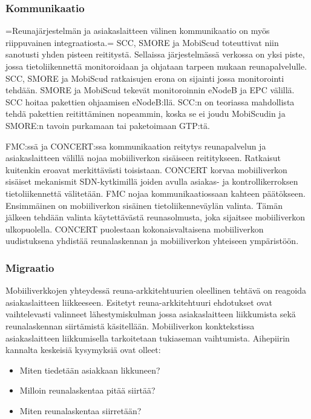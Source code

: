 \subsubsection{Kommunikaatio}
=Reunajärjestelmän ja asiakaslaitteen välinen kommunikaatio on myös riippuvainen integraatiosta.=
SCC, SMORE ja MobiScud toteuttivat niin sanotusti yhden pisteen reititystä.
Sellaissa järjestelmässä verkossa on yksi piste, jossa tietoliikennettä monitoroidaan ja ohjataan tarpeen mukaan reunapalvelulle. SCC, SMORE ja MobiScud ratkaisujen erona on sijainti jossa monitorointi tehdään. SMORE ja MobiScud tekevät monitoroinnin eNodeB ja EPC välillä. SCC hoitaa pakettien ohjaamisen eNodeB:llä. SCC:n on teoriassa mahdollista tehdä pakettien reitittäminen nopeammin, koska se ei joudu MobiScudin ja SMORE:n tavoin purkamaan tai paketoimaan GTP:tä.

FMC:ssä ja CONCERT:ssa kommunikaation reitytys reunapalvelun ja asiakaslaitteen välillä nojaa mobiiliverkon sisäiseen reititykseen. 
Ratkaisut kuitenkin eroavat merkittävästi toisistaan. CONCERT korvaa mobiiliverkon sisäiset mekanismit SDN-kytkimillä joiden avulla asiakas- ja kontrollikerroksen tietoliikennettä välitetään.
FMC nojaa kommunikaatiossaan kahteen päätökseen. 
Ensimmäinen on mobiiliverkon sisäinen tietoliikenneväylän valinta. Tämän jälkeen tehdään valinta käytettävästä reunasolmusta, joka sijaitsee mobiiliverkon ulkopuolella.
CONCERT puolestaan kokonaisvaltaisena mobiiliverkon uudistuksena yhdistää reunalaskennan ja mobiiliverkon yhteiseen ympäristöön.


\subsubsection{Migraatio}

Mobiiliverkkojen yhteydessä reuna-arkkitehtuurien oleellinen tehtävä on reagoida asiakaslaitteen liikkeeseen.
Esitetyt reuna-arkkitehtuuri ehdotukset ovat vaihtelevasti valinneet lähestymiskulman jossa asiakaslaitteen liikkumista sekä reunalaskennan siirtämistä käsitellään. 
Mobiiliverkon konktekstissa asiakaslaitteen liikkumisella tarkoitetaan tukiaseman vaihtumista.
Aihepiirin kannalta keskeisiä kysymyksiä ovat olleet:
\begin{itemize}
\item Miten tiedetään asiakkaan likkuneen?
\item Milloin reunalaskentaa pitää siirtää?
\item Miten reunalaskentaa siirretään?
\end{itemize}

